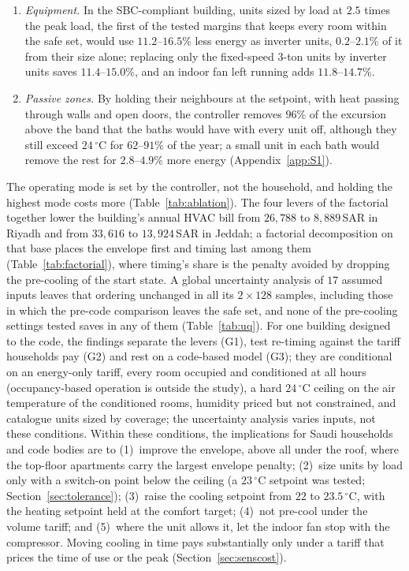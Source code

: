 \documentclass[10pt,a4paper,twocolumn]{article}
\theoremstyle{definition}
\newcommand{\hlTightSp}{23}
\newcommand{\hlFacStartR}{26{{,}}788}
\newcommand{\hlFacEndR}{8{{,}}889}
\newcommand{\hlFacStartJ}{33{{,}}616}
\newcommand{\hlFacEndJ}{13{{,}}924}
\newcommand{\hlUQn}{128}
\begin{document}
\begin{enumerate}[label=(\arabic*),leftmargin=1.6em,itemsep=2pt,topsep=2pt]
\item \emph{Equipment.} In the SBC-compliant building, units sized by load at $2.5$ times the peak load, the first of the tested margins that keeps every room within the safe set, would use $11.2$--$16.5$\% less energy as inverter units, $0.2$--$2.1$\% of it from their size alone; replacing only the fixed-speed 3-ton units by inverter units saves $11.4$--$15.0$\%, and an indoor fan left running adds $11.8$--$14.7$\%.
\item \emph{Passive zones.} By holding their neighbours at the setpoint, with heat passing through walls and open doors, the controller removes $96$\% of the excursion above the band that the baths would have with every unit off, although they still exceed $24\,^{\circ}$C for $62$--$91$\% of the year; a small unit in each bath would remove the rest for $2.8$--$4.9$\% more energy (Appendix~\ref{app:S1}).
\end{enumerate}
The operating mode is set by the controller, not the household, and holding the highest mode costs more (Table~\ref{tab:ablation}). The four levers of the factorial together lower the building's annual HVAC bill from $\hlFacStartR$ to $\hlFacEndR\,$SAR in Riyadh and from $\hlFacStartJ$ to $\hlFacEndJ\,$SAR in Jeddah; a factorial decomposition on that base places the envelope first and timing last among them (Table~\ref{tab:factorial}), where timing's share is the penalty avoided by dropping the pre-cooling of the start state. A global uncertainty analysis of $17$ assumed inputs leaves that ordering unchanged in all its $2\times\hlUQn$ samples, including those in which the pre-code comparison leaves the safe set, and none of the pre-cooling settings tested saves in any of them (Table~\ref{tab:uq}). For one building designed to the code, the findings separate the levers (G1), test re-timing against the tariff households pay (G2) and rest on a code-based model (G3); they are conditional on an energy-only tariff, every room occupied and conditioned at all hours (occupancy-based operation is outside the study), a hard $24\,^{\circ}$C ceiling on the air temperature of the conditioned rooms, humidity priced but not constrained, and catalogue units sized by coverage; the uncertainty analysis varies inputs, not these conditions. Within these conditions, the implications for Saudi households and code bodies are to (1)~improve the envelope, above all under the roof, where the top-floor apartments carry the largest envelope penalty; (2)~size units by load only with a switch-on point below the ceiling (a $\hlTightSp\,^{\circ}$C setpoint was tested; Section~\ref{sec:tolerance}); (3)~raise the cooling setpoint from $22$ to $23.5\,^{\circ}$C, with the heating setpoint held at the comfort target; (4)~not pre-cool under the volume tariff; and (5)~where the unit allows it, let the indoor fan stop with the compressor. Moving cooling in time pays substantially only under a tariff that prices the time of use or the peak (Section~\ref{sec:senscost}).
\appendix
\end{document}
